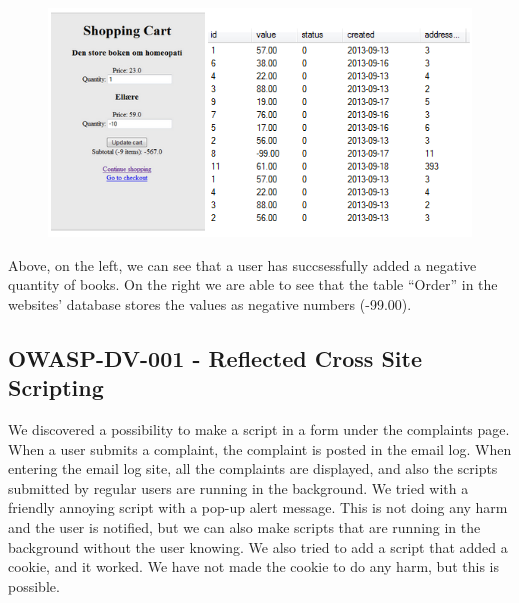 \begin{figure}[!ht]
\includegraphics[scale=0.7]{pics/testtest4.png}
\end{figure}

Above, on the left, we can see that a user has succsessfully added a negative quantity of books. On the right we are able to see that the table “Order” in the websites’ database stores the values as negative numbers (-99.00). 

\subsection{OWASP-DV-001 - Reflected Cross Site Scripting}
We discovered a possibility to make a script in a form under the complaints page. When a user submits a complaint, the complaint is posted in the email log. When entering the email log site, all the complaints are displayed, and also the scripts submitted by regular users are running in the background. We tried with a friendly annoying script with a pop-up alert message. This is not doing any harm and the user is notified, but we can also make scripts that are running in the background without the user knowing. We also tried to add a script that added a cookie, and it worked. We have not made the cookie to do any harm, but this is possible. 

